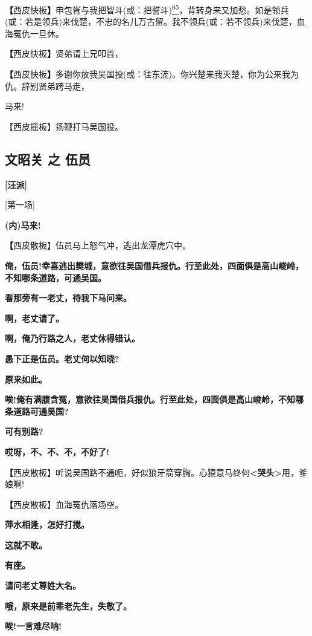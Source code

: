 \textbf{【}西皮快板\textbf{】}申包胥与我把智斗(或：把誓斗)\protect\hyperlink{fn65}{\textsuperscript{65}}，背转身来又加愁。如是领兵(或：若是领兵)来伐楚，不忠的名儿万古留。我不领兵(或：若不领兵)来伐楚，血海冤仇一旦休。

\textbf{【}西皮快板\textbf{】}贤弟请上兄叩首，

\textbf{【}西皮快板\textbf{】}多谢你放我吴国投(或：往东流)。你兴楚来我灭楚，你为公来我为仇。辞别贤弟跨马走，

马来!

【西皮摇板】扬鞭打马吴国投。

\newpage
\hypertarget{ux6587ux662dux5173-ux4e4b-ux4f0dux5458}{%
\subsection{文昭关 之
伍员}\label{ux6587ux662dux5173-ux4e4b-ux4f0dux5458}}

\textbf{{[}汪派{]}}

{[}第一场{]}

\textbf{(内)马来!}

\textbf{【}西皮散板】伍员马上怒气冲，逃出龙潭虎穴中。

\textbf{俺，伍员!幸喜逃出樊城，意欲往吴国借兵报仇。行至此处，四面俱是高山峻岭，不知哪条道路，可通吴国。}

\textbf{看那旁有一老丈，待我下马问来。}

\textbf{啊，老丈请了。}

\textbf{啊，俺乃行路之人，老丈休得错认。}

\textbf{愚下正是伍员。老丈何以知晓?}

\textbf{原来如此。}

\textbf{唉!俺有满腹含冤，意欲往吴国借兵报仇。行至此处，四面俱是高山峻岭，不知哪条道路可通吴国?}

\textbf{可有别路?}

\textbf{哎呀，不、不、不，不好了!}

\textbf{【}西皮散板】听说吴国路不通呃，好似狼牙箭穿胸。心猿意马终何\textbf{\textless{}哭头\textgreater{}}用，爹娘啊!

\textbf{【}西皮散板】血海冤仇落场空。

\textbf{萍水相逢，怎好打搅。}

\textbf{这就不敢。}

\textbf{有座。}

\textbf{请问老丈尊姓大名。}

\textbf{哦，原来是前辈老先生，失敬了。}

\textbf{唉!一言难尽呐!}

